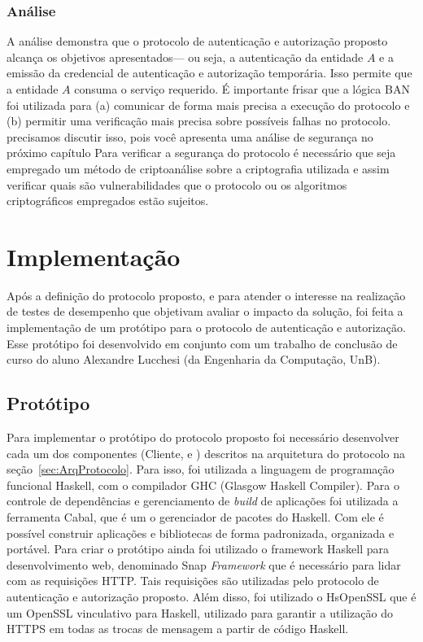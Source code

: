 \subsubsection{Análise}

A análise demonstra que o protocolo de autenticação e autorização proposto alcança os objetivos apresentados--- ou seja, a autenticação da entidade ${A}$ e a emissão da credencial de autenticação e autorização temporária. Isso permite que a entidade ${A}$ consuma o serviço requerido. É importante frisar que a lógica BAN foi utilizada para (a) comunicar
de forma mais precisa a execução do protocolo e (b) permitir uma verifica\c c\~{a}o mais precisa sobre possíveis falhas no protocolo.
{\color{blue}precisamos discutir isso, pois voc\^{e} apresenta uma an\'{a}lise de seguran\c ca no pr\'{o}ximo cap\'{i}tulo} Para verificar a segurança do protocolo é necessário que seja empregado um método de criptoanálise sobre a criptografia utilizada e assim verificar quais são vulnerabilidades que o protocolo ou os algoritmos criptográficos empregados estão sujeitos.


\section{Implementação}\label{sec:implementacao}

Após a definição do protocolo proposto, e para atender o interesse na realização de testes de desempenho que objetivam avaliar o impacto da solução,
foi feita a implementa\c c\~{a}o de um protótipo para o protocolo de autenticação e autorização. Esse protótipo foi desenvolvido em conjunto com um
trabalho de conclus\~{a}o de curso do aluno Alexandre Lucchesi (da Engenharia da Computa\c c\~{a}o, UnB).

\subsection{Protótipo}

Para implementar o protótipo do protocolo proposto foi necessário desenvolver cada um dos componentes (Cliente, \servidorAA e \servidorRest) descritos na arquitetura
do protocolo na seção~\ref{sec:ArqProtocolo}. Para isso, foi utilizada a linguagem de programação funcional Haskell, com o compilador GHC (Glasgow Haskell Compiler).
Para o controle de dependências e gerenciamento de \emph{build} de aplicações foi utilizada a ferramenta Cabal, que é um o gerenciador de pacotes do Haskell. Com ele é possível construir aplicações e bibliotecas de forma padronizada, organizada e portável. Para criar o protótipo ainda foi utilizado o framework Haskell para desenvolvimento web, denominado Snap \emph{Framework} que é necessário para lidar com as requisições HTTP. Tais requisi\c c\~{o}es são utilizadas pelo protocolo de autenticação e autorização proposto. Além disso, foi utilizado o HsOpenSSL que é um OpenSSL {\color{red}vinculativo} para Haskell, utilizado para garantir a utilização do HTTPS em todas as trocas de mensagem a partir de código Haskell.

